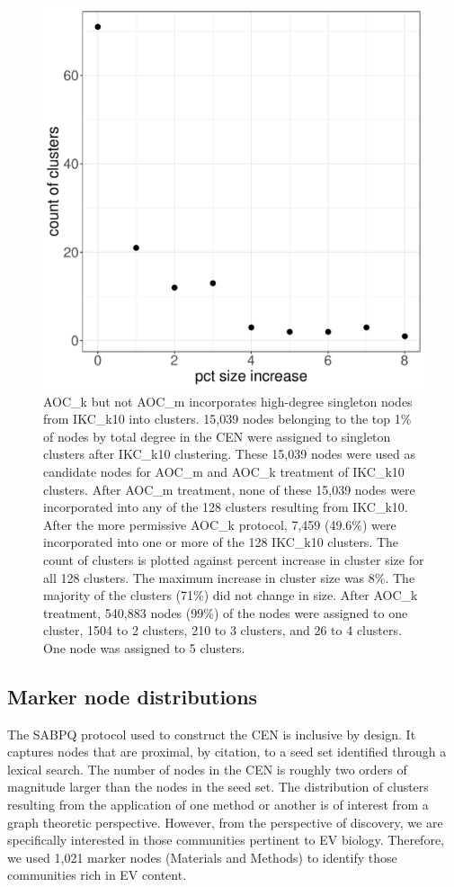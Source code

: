 \documentclass[12pt, oneside]{article}   	%
\begin{document}
\begin{figure}[H]
	\centering
	 \includegraphics[width=0.6\linewidth]{singletons.pdf} 
\captionsetup{width=0.9\textwidth}
\caption{AOC\_k but not AOC\_m incorporates high-degree singleton nodes from IKC\_k10 into clusters. 15,039 nodes belonging to the top  1\% of nodes by total degree in the CEN were assigned to singleton clusters after IKC\_k10 clustering. 
These 15,039  nodes were used as candidate nodes for AOC\_m and AOC\_k treatment of IKC\_k10 clusters. After AOC\_m treatment, none of these 15,039 nodes were incorporated into any of the 128 clusters resulting from  IKC\_k10. After the more permissive AOC\_k protocol, 7,459 (49.6\%) were incorporated into one or more of the 128 IKC\_k10 clusters. The count of clusters is plotted against percent increase in cluster size for all 128 clusters. The maximum increase in cluster size was 8\%. The majority of the clusters (71\%) did not change in size. After AOC\_k treatment, 540,883 nodes (99\%) of the nodes were assigned to one cluster, 1504 to 2 clusters, 210 to 3 clusters, and 26 to 4 clusters. One node was assigned to 5 clusters.}
\label{fig:singleton}
\end{figure}

\subsection{Marker node distributions}

The SABPQ protocol  \citep{Wedell2022} used to construct the CEN is inclusive by design. It captures nodes that are proximal, by citation, to a seed set identified through a lexical search. The number of nodes in the CEN is roughly two orders of magnitude larger than the nodes in the seed set. The distribution of clusters resulting from the application of one method or another is of interest from a graph theoretic perspective. However, from the perspective of discovery, we are specifically interested in those communities pertinent to EV biology. Therefore, we used 1,021 marker nodes (Materials and Methods) to identify those communities rich in EV content. 
\end{document}
